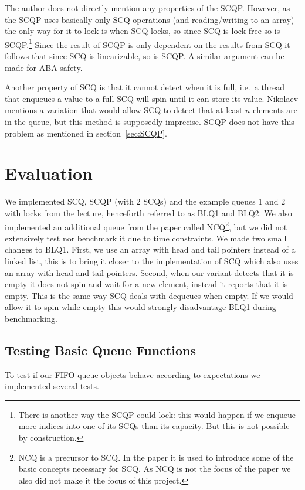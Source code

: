 \documentclass{article}      %
\begin{document}
The author does not directly mention any properties of the SCQP. However, as the SCQP uses basically only SCQ operations (and reading/writing to an array) the only way for it to lock is when SCQ locks, so since SCQ is lock-free so is SCQP.\footnote{There is another way the SCQP could lock: this would happen if we enqueue more indices into one of its SCQs than its capacity. But this is not possible by construction.} Since the result of SCQP is only dependent on the results from SCQ it follows that since SCQ is linearizable, so is SCQP. A similar argument can be made for ABA safety.

Another property of SCQ is that it cannot detect when it is full, i.e.\ a thread that enqueues a value to a full SCQ will spin until it can store its value. Nikolaev mentions a variation that would allow SCQ to detect that at least $n$ elements are in the queue, but this method is supposedly imprecise. SCQP does not have this problem as mentioned in section~\ref{sec:SCQP}.

\section{Evaluation}
We implemented SCQ, SCQP (with 2 SCQs) and the example queues 1 and 2 with locks from the lecture, henceforth referred to as BLQ1 and BLQ2. We also implemented an additional queue from the paper called NCQ\footnote{NCQ is a precursor to SCQ. In the paper it is used to introduce some of the basic concepts necessary for SCQ. As NCQ is not the focus of the paper we also did not make it the focus of this project.}, but we did not extensively test nor benchmark it due to time constraints. We made two small changes to BLQ1. First, we use an array with head and tail pointers instead of a linked list, this is to bring it closer to the implementation of SCQ which also uses an array with head and tail pointers. Second, when our variant detects that it is empty it does not spin and wait for a new element, instead it reports that it is empty. This is the same way SCQ deals with dequeues when empty. If we would allow it to spin while empty this would strongly disadvantage BLQ1 during benchmarking.

\subsection{Testing Basic Queue Functions}
To test if our FIFO queue objects behave according to expectations we implemented several tests. 
\end{document}
